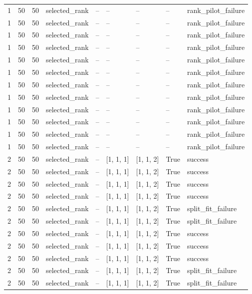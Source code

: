\begin{longtable}{lllllllll}
1 & 50 & 50 & selected\_rank & -- & -- & -- & -- & rank\_pilot\_failure \\
1 & 50 & 50 & selected\_rank & -- & -- & -- & -- & rank\_pilot\_failure \\
1 & 50 & 50 & selected\_rank & -- & -- & -- & -- & rank\_pilot\_failure \\
1 & 50 & 50 & selected\_rank & -- & -- & -- & -- & rank\_pilot\_failure \\
1 & 50 & 50 & selected\_rank & -- & -- & -- & -- & rank\_pilot\_failure \\
1 & 50 & 50 & selected\_rank & -- & -- & -- & -- & rank\_pilot\_failure \\
1 & 50 & 50 & selected\_rank & -- & -- & -- & -- & rank\_pilot\_failure \\
1 & 50 & 50 & selected\_rank & -- & -- & -- & -- & rank\_pilot\_failure \\
1 & 50 & 50 & selected\_rank & -- & -- & -- & -- & rank\_pilot\_failure \\
1 & 50 & 50 & selected\_rank & -- & -- & -- & -- & rank\_pilot\_failure \\
1 & 50 & 50 & selected\_rank & -- & -- & -- & -- & rank\_pilot\_failure \\
1 & 50 & 50 & selected\_rank & -- & -- & -- & -- & rank\_pilot\_failure \\
2 & 50 & 50 & selected\_rank & -- & [1, 1, 1] & [1, 1, 2] & True & success \\
2 & 50 & 50 & selected\_rank & -- & [1, 1, 1] & [1, 1, 2] & True & success \\
2 & 50 & 50 & selected\_rank & -- & [1, 1, 1] & [1, 1, 2] & True & success \\
2 & 50 & 50 & selected\_rank & -- & [1, 1, 1] & [1, 1, 2] & True & success \\
2 & 50 & 50 & selected\_rank & -- & [1, 1, 1] & [1, 1, 2] & True & split\_fit\_failure \\
2 & 50 & 50 & selected\_rank & -- & [1, 1, 1] & [1, 1, 2] & True & split\_fit\_failure \\
2 & 50 & 50 & selected\_rank & -- & [1, 1, 1] & [1, 1, 2] & True & success \\
2 & 50 & 50 & selected\_rank & -- & [1, 1, 1] & [1, 1, 2] & True & success \\
2 & 50 & 50 & selected\_rank & -- & [1, 1, 1] & [1, 1, 2] & True & success \\
2 & 50 & 50 & selected\_rank & -- & [1, 1, 1] & [1, 1, 2] & True & split\_fit\_failure \\
2 & 50 & 50 & selected\_rank & -- & [1, 1, 1] & [1, 1, 2] & True & split\_fit\_failure \\

\end{longtable}
